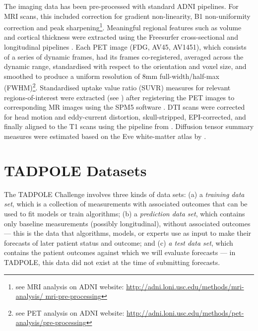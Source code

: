 The imaging data has been pre-processed with standard ADNI pipelines.  For MRI scans, this included correction for gradient non-linearity, B1 non-uniformity correction and peak sharpening\footnote{see MRI analysis on ADNI website: \url{http://adni.loni.usc.edu/methods/mri-analysis/
mri-pre-processing}}. Meaningful regional features such as volume and cortical thickness were extracted using the Freesurfer cross-sectional and longitudinal pipelines \cite{reuter2012within}. Each PET image (FDG, AV45, AV1451), which consists of a series of dynamic frames, had its frames co-registered, averaged across the dynamic range, standardised with respect to the orientation and voxel size, and smoothed to produce a uniform resolution of 8mm full-width/half-max (FWHM)\footnote{see PET analysis on ADNI website: \url{http://adni.loni.usc.edu/methods/pet-analysis/pre-processing}}. Standardised uptake value ratio (SUVR) measures for relevant regions-of-interest were extracted (see \cite{jagust2010alzheimer}) after registering the PET images to corresponding MR images using the SPM5 software \cite{ashburner2009computational}. DTI scans were corrected for head motion and eddy-current distortion, skull-stripped, EPI-corrected, and finally aligned to the T1 scans using the pipeline from \cite{nir2013effectiveness}. Diffusion tensor summary measures were estimated based on the Eve white-matter atlas by \cite{oishi2009atlas}. 

\section{TADPOLE Datasets}
\label{datasets}


The TADPOLE Challenge involves three kinds of data sets: (a) a \emph{training data set}, which is a collection of measurements with associated outcomes that can be used to fit models or train algorithms; (b) a \emph{prediction data set}, which contains only baseline measurements (possibly longitudinal), without associated outcomes --- this is the data that algorithms, models, or experts use as input to make their forecasts of later patient status and outcome; and (c) \emph{a test data set}, which contains the patient outcomes against which we will evaluate forecasts --- in TADPOLE, this data did not exist at the time of submitting forecasts.


